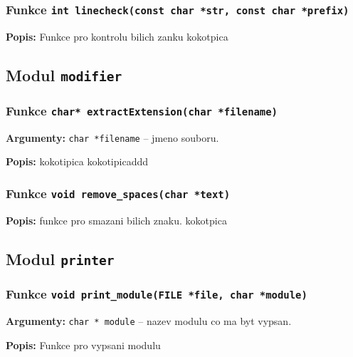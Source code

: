 \documentclass[12pt, a4paper]{article}
\begin{document}
\subsubsection{Funkce \texttt{int linecheck(const char *str, const char *prefix)}}
\textbf{Popis: }Funkce pro kontrolu bilich zanku kokotpica\\
\par\noindent
\subsection{Modul \texttt{modifier}}
\subsubsection{Funkce \texttt{char* extractExtension(char *filename)}}
\textbf{Argumenty: }\verb"char *filename" -- jmeno souboru. \\
\par\noindent
\textbf{Popis: }kokotipica kokotipicaddd\\
\par\noindent
\subsubsection{Funkce \texttt{void remove\_spaces(char *text)}}
\textbf{Popis: }funkce pro smazani bilich znaku. kokotpica\\
\par\noindent
\subsection{Modul \texttt{printer}}
\subsubsection{Funkce \texttt{void print\_module(FILE *file, char *module)}}
\textbf{Argumenty: }\verb"char * module" -- nazev modulu co ma byt vypsan. \\
\par\noindent
\textbf{Popis: }Funkce pro vypsani modulu\\
\par\noindent
\end{document}
